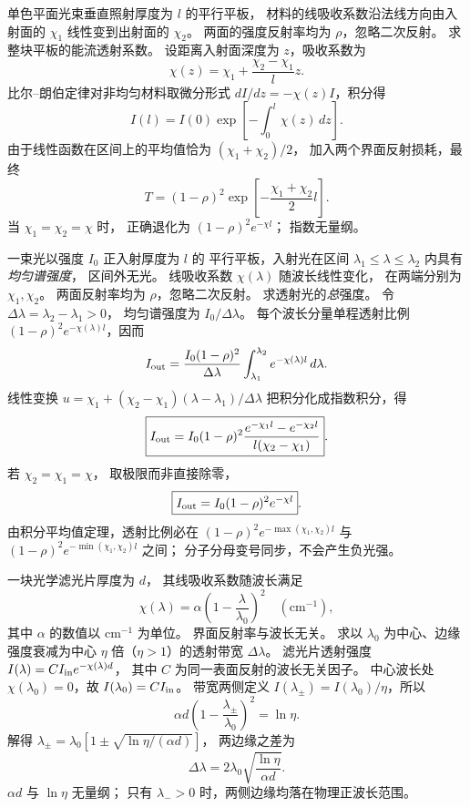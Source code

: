 单色平面光束垂直照射厚度为 $l$ 的平行平板，
材料的线吸收系数沿法线方向由入射面的 $\chi_1$
线性变到出射面的 $\chi_2$。
两面的强度反射率均为 $\rho$，忽略二次反射。
求整块平板的能流透射系数。
\exsolution
设距离入射面深度为 $z$，吸收系数为
\[
 \chi(z)=\chi_1+\frac{\chi_2-\chi_1}{l}z.
\]
比尔--朗伯定律对非均匀材料取微分形式
$dI/dz=-\chi(z)I$，积分得
\[
 I(l)=I(0)\exp\left[-\int_0^l\chi(z)\,dz\right].
\]
由于线性函数在区间上的平均值恰为
$(\chi_1+\chi_2)/2$，
加入两个界面反射损耗，最终
\[
 \boxed{T=(1-\rho)^2
 \exp\left[-\frac{\chi_1+\chi_2}{2}l\right]}.
\]
\excheck 当 $\chi_1=\chi_2=\chi$ 时，
正确退化为 $(1-\rho)^2e^{-\chi l}$；
指数无量纲。

一束光以强度 $I_0$ 正入射厚度为 $l$ 的
平行平板，入射光在区间
$\lambda_1\le\lambda\le\lambda_2$ 内具有\emph{均匀谱强度}，
区间外无光。
线吸收系数 $\chi(\lambda)$ 随波长线性变化，
在两端分别为 $\chi_1,\chi_2$。
两面反射率均为 $\rho$，忽略二次反射。
求透射光的\emph{总}强度。
\exsolution
令 $\Delta\lambda=\lambda_2-\lambda_1>0$，
均匀谱强度为 $I_0/\Delta\lambda$。
每个波长分量单程透射比例
$(1-\rho)^2e^{-\chi(\lambda)l}$，因而
\[
 I_{\rm out}=\frac{I_0(1-\rho)^2}{\Delta\lambda}
 \int_{\lambda_1}^{\lambda_2}
 e^{-\chi(\lambda)l}\,d\lambda.
\]
线性变换
$u=\chi_1+(\chi_2-\chi_1)
(\lambda-\lambda_1)/\Delta\lambda$
把积分化成指数积分，得
\[
 \boxed{I_{\rm out}
 =I_0(1-\rho)^2
 \frac{e^{-\chi_1l}-e^{-\chi_2l}}
 {l(\chi_2-\chi_1)}}.
\]
若 $\chi_2=\chi_1=\chi$，
取极限而非直接除零，
\[
 \boxed{I_{\rm out}
 =I_0(1-\rho)^2 e^{-\chi l}}.
\]
\excheck 由积分平均值定理，透射比例必在
$(1-\rho)^2e^{-\max(\chi_1,\chi_2)l}$ 与
$(1-\rho)^2e^{-\min(\chi_1,\chi_2)l}$ 之间；
分子分母变号同步，不会产生负光强。

一块光学滤光片厚度为 $d$，
其线吸收系数随波长满足
\[
 \chi(\lambda)=\alpha\left(1-\frac\lambda{\lambda_0}\right)^2
 \quad(\mathrm{cm}^{-1}),
\]
其中 $\alpha$ 的数值以 $\mathrm{cm}^{-1}$ 为单位。
界面反射率与波长无关。
求以 $\lambda_0$ 为中心、边缘强度衰减为中心
$\eta$ 倍（$\eta>1$）的透射带宽 $\Delta\lambda$。
\exsolution
滤光片透射强度
$I(\lambda)=C I_{\rm in}e^{-\chi(\lambda)d}$，
其中 $C$ 为同一表面反射的波长无关因子。
中心波长处 $\chi(\lambda_0)=0$，故
$I(\lambda_0)=CI_{\rm in}$。
带宽两侧定义
$I(\lambda_\pm)=I(\lambda_0)/\eta$，所以
\[
 \alpha d
 \left(1-\frac{\lambda_\pm}{\lambda_0}\right)^2
 =\ln\eta.
\]
解得
$\lambda_\pm=\lambda_0[1\pm
\sqrt{\ln\eta/(\alpha d)}]$，
两边缘之差为
\[
 \boxed{\Delta\lambda=
 2\lambda_0\sqrt{\frac{\ln\eta}{\alpha d}}}.
\]
\excheck $\alpha d$ 与 $\ln\eta$ 无量纲；
只有 $\lambda_->0$ 时，两侧边缘均落在物理正波长范围。

